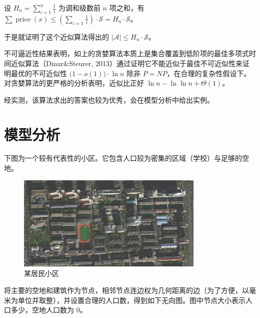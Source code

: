 \documentclass{cumcmthesis}
\begin{document}
设 $H_n=\sum_{i=1}^n\frac 1 i$ 为调和级数前 $n$ 项之和，有 $\sum \operatorname{price}(x) \le (\sum_{i=1}\frac{1}{i}) \cdot \mathscr{S} = H_n \cdot \mathscr{S}$。

于是就证明了这个近似算法得出的 $|\mathscr{A}| \le H_n \cdot \mathscr{S}$。

不可逼近性结果表明，如上的贪婪算法本质上是集合覆盖到低阶项的最佳多项式时间近似算法（Dinur\&Steurer, 2013）通过证明它不能近似于最佳不可近似性来证明最优的不可近似性 ${\displaystyle {\bigl (}1-o(1){\bigr )}\cdot \ln {n}}\text{ 除非 } P{\displaystyle =}NP$，在合理的复杂性假设下。对贪婪算法的更严格的分析表明，近似比正好 ${\displaystyle \ln {n}-\ln {\ln {n}}+\Theta(1)}$。

经实测，该算法求出的答案也较为优秀，会在模型分析中给出实例。

\section{模型分析}

下图为一个较有代表性的小区。它包含人口较为密集的区域（学校）与足够的空地。

\begin{figure}[H]
    \centering
    \includegraphics[width=0.8\textwidth]{images/scaled.png}
    \caption{某居民小区}
    \label{fig:scaled}
\end{figure}

将主要的空地和建筑作为节点，相邻节点连边权为几何距离的边（为了方便，以毫米为单位并取整），并设置合理的人口数，得到如下无向图。图中节点大小表示人口多少，空地人口数为 $0$。
\end{document}
